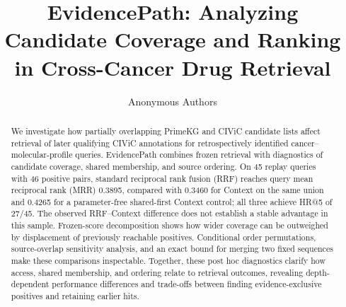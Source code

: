 \documentclass[runningheads]{llncs}
\begin{document}
\title{EvidencePath: Analyzing Candidate Coverage and Ranking in Cross-Cancer Drug Retrieval}
\author{Anonymous Authors}
\institute{}
\maketitle
\begin{abstract}
We investigate how partially overlapping PrimeKG and CIViC candidate lists affect retrieval of later qualifying CIViC annotations for retrospectively identified cancer--molecular-profile queries. EvidencePath combines frozen retrieval with diagnostics of candidate coverage, shared membership, and source ordering. On 45 replay queries with 46 positive pairs, standard reciprocal rank fusion (RRF) reaches query mean reciprocal rank (MRR) 0.3895, compared with 0.3460 for Context on the same union and 0.4265 for a parameter-free shared-first Context control; all three achieve HR@5 of 27/45. The observed RRF--Context difference does not establish a stable advantage in this sample. Frozen-score decomposition shows how wider coverage can be outweighed by displacement of previously reachable positives. Conditional order permutations, source-overlap sensitivity analysis, and an exact bound for merging two fixed sequences make these comparisons inspectable. Together, these post hoc diagnostics clarify how access, shared membership, and ordering relate to retrieval outcomes, revealing depth-dependent performance differences and trade-offs between finding evidence-exclusive positives and retaining earlier hits.
\end{abstract}






\end{document}
